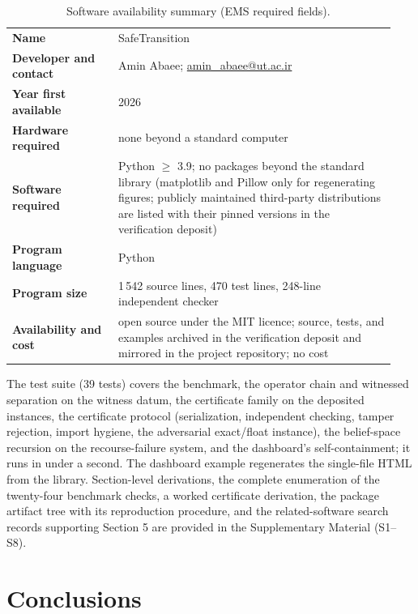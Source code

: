 \documentclass[3p,11pt]{elsarticle}
\begin{document}
\begin{table}[h]
\centering
\small
\begin{tabular}{@{}p{0.26\linewidth}p{0.68\linewidth}@{}}
\toprule
\textbf{Name} & SafeTransition \\
\textbf{Developer and contact} & Amin Abaee;
\href{mailto:amin_abaee@ut.ac.ir}{amin\_abaee@ut.ac.ir} \\
\textbf{Year first available} & 2026 \\
\textbf{Hardware required} & none beyond a standard computer \\
\textbf{Software required} & Python $\geq$ 3.9; no packages beyond the
standard library (matplotlib and Pillow only for regenerating figures;
publicly maintained third-party distributions are listed with their pinned
versions in the verification deposit) \\
\textbf{Program language} & Python \\
\textbf{Program size} & 1\,542 source lines, 470 test lines, 248-line
independent checker \\
\textbf{Availability and cost} & open source under the MIT licence; source,
tests, and examples archived in the verification deposit \citep{Deposit2026}
and mirrored in the project repository; no cost \\
\bottomrule
\end{tabular}
\caption{Software availability summary (EMS required fields).}
\label{tab:availability}
\end{table}

The test suite (39 tests) covers the benchmark, the operator chain and
witnessed separation on the witness datum, the certificate family on the
deposited instances, the certificate protocol (serialization, independent
checking, tamper rejection, import hygiene, the adversarial exact/float
instance), the belief-space recursion on the recourse-failure system, and
the dashboard's self-containment; it runs in under a second.
The dashboard example regenerates the single-file HTML from the library.
Section-level derivations, the complete enumeration of the twenty-four
benchmark checks, a worked certificate derivation, the package artifact
tree with its reproduction procedure, and the related-software search
records supporting Section 5 are provided in the Supplementary Material
(S1--S8).

\section{Conclusions}\label{sec:conclusions}
\end{document}
